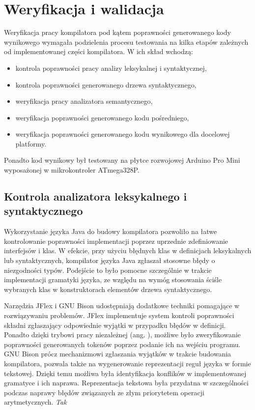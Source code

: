 \chapter{Weryfikacja i walidacja}
\label{ch:06}
Weryfikacja pracy kompilatora pod kątem poprawności generowanego kody wynikowego wymagała podzielenia procesu testowania na kilka etapów zależnych od implementowanej części kompilatora. W ich skład wchodzą:
\begin{itemize}
\item kontrola poprawności pracy analizy leksykalnej i syntaktycznej,
\item kontrola poprawności generowanego drzewa syntaktycznego,
\item weryfikacja pracy analizatora semantycznego,
\item weryfikacja poprawności generowanego kodu pośredniego,
\item weryfikacja poprawności generowanego kodu wynikowego dla docelowej platformy.
\end{itemize}
Ponadto kod wynikowy był testowany na płytce rozwojowej Arduino Pro Mini wyposażonej w mikrokontroler ATmega328P.

\section{Kontrola analizatora leksykalnego i syntaktycznego}
Wykorzystanie języka Java do budowy kompilatora pozwoliło na łatwe kontrolowanie poprawności implementacji poprzez uprzednie zdefiniowanie interfejsów i klas. W efekcie, przy użyciu błędnych klas w definicjach leksykalnych lub syntaktycznych, kompilator języka Java zgłaszał stosowne błędy o niezgodności typów. Podejście to było pomocne szczególnie w trakcie implementacji gramatyki języka, ze względu na wymóg stosowania ściśle wybranych klas w konstruktorach elementów drzewa syntaktycznego.

Narzędzia JFlex i GNU Bison udostępniają dodatkowe techniki pomagające w rozwiązywaniu problemów. JFlex implementuje system kontroli poprawności składni zgłaszający odpowiednie wyjątki w przypadku błędów w definicji. Ponadto dzięki trybowi pracy niezależnej (ang. ), możliwe było zweryfikowanie poprawności generowanych tokenów poprzez podanie ich na wejściu programu.
GNU Bison prócz mechanizmowi zgłaszania wyjątków w trakcie budowania kompilatora, pozwala także na wygenerowanie reprezentacji reguł języka w formie tekstowej. Dzięki temu możliwa była identyfikacja konflików w implementowanej gramatyce i ich naprawa. Reprezentacja tekstowa była przydatna w szczególności podczas naprawy błędów związanych ze złym priorytetem operacji arytmetycznych.
 \textit{Tak}

